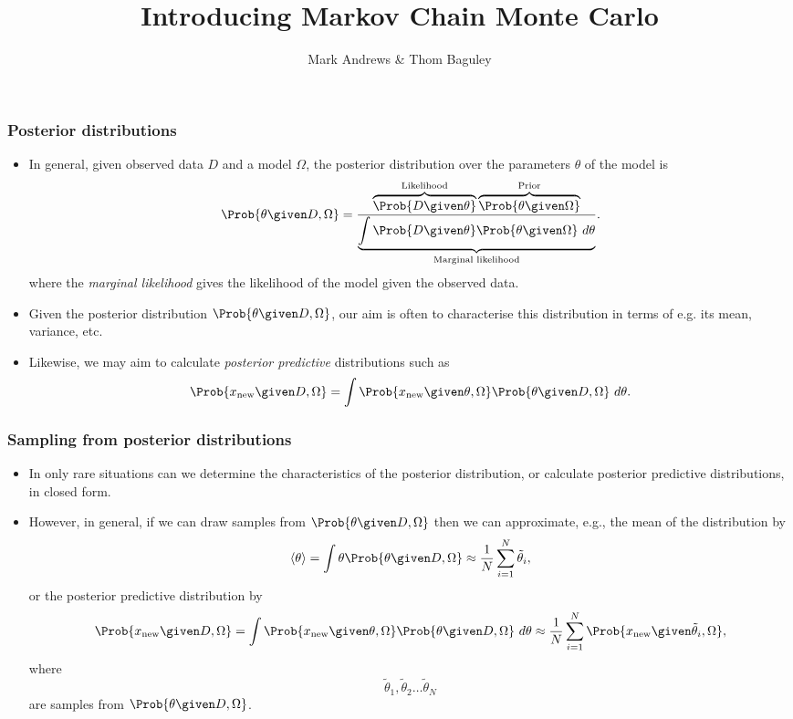\documentclass{slides}
\title[MCMC]{Introducing Markov Chain Monte Carlo}
\author[Andrews]{Mark Andrews \& Thom Baguley}
\date{}
\begin{document}
{
	\begin{frame}
		\titlepage
	\end{frame}
}


\begin{frame}
	\frametitle{Posterior distributions}
	\begin{itemize}

		\item In general, given observed data $D$ and a model $\Omega$, the posterior distribution over the parameters $\theta$ of the model is
		\[
			\Prob{\theta\given D, \Omega}
			= \frac{\overbrace{\Prob{D\given\theta}}^{\text{Likelihood}}\overbrace{\Prob{\theta\given\Omega}}^{\text{Prior}}}
			{\underbrace{\int\Prob{D\given\theta}\Prob{\theta\given\Omega}\ d\theta}_{\text{Marginal likelihood}}}.
		\]
		where the \emph{marginal likelihood} gives the likelihood of the model given the observed data.

	\item Given the posterior distribution $\Prob{\theta\given D, \Omega}$, our aim is often to characterise this distribution in terms of e.g. its mean, variance, etc. 
	\item Likewise, we may aim to calculate \emph{posterior predictive} distributions such as 
		\[
			\Prob{x_{\text{new}} \given D, \Omega} = \int\Prob{x_{\text{new}}\given\theta,\Omega}\Prob{\theta\given D, \Omega}\ d\theta.
		\]

	\end{itemize}
\end{frame}

\begin{frame}
	\frametitle{Sampling from posterior distributions}
	\begin{itemize}

		\item In only rare situations can we determine the characteristics of the posterior distribution, or calculate posterior predictive distributions, in closed form.
		\item However, in general, if we can draw samples from $\Prob{\theta\given D, \Omega}$ then we can approximate, e.g., the mean of the distribution by
			\[
				\langle\theta\rangle = \int\theta\Prob{\theta\given D, \Omega} \approx \frac{1}{N} \sum_{i=1}^N \tilde{\theta}_i,
			\]
		or the posterior predictive distribution by 
		\[
			\Prob{x_{\text{new}} \given D, \Omega} = \int\Prob{x_{\text{new}}\given\theta,\Omega}\Prob{\theta\given D, \Omega}\ d\theta
			\approx \frac{1}{N} \sum_{i=1}^N \Prob{x_{\text{new}}\given\tilde{\theta}_i,\Omega},
		\]
		where \[\tilde{\theta}_1, \tilde{\theta}_2 \ldots \tilde{\theta}_N\] are samples from $\Prob{\theta\given D, \Omega}$.
	\end{itemize}
\end{frame}
\end{document}
